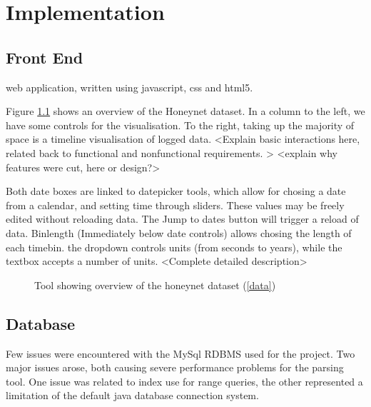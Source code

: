 \chapter{Implementation}\label{C:impl}

\section{Front End}  %

web application, written using javascript, css and html5.

Figure \ref{overview} shows an overview of the Honeynet dataset. In a column to the left, we have some controls for the visualisation. To the right, taking up the majority of space is a timeline visualisation of logged data.  
<Explain basic interactions here, related back to functional and nonfunctional requirements. >
<explain why features were cut, here or design?>

Both date boxes are linked to datepicker tools, which allow for chosing a date from a calendar, and setting time through sliders. These values may be freely edited without reloading data. The Jump to dates button will trigger a reload of data. 
Binlength (Immediately below date controls) allows chosing the length of each timebin. the dropdown controls units (from seconds to years), while the textbox accepts a number of units.
<Complete detailed description>
\begin{figure}[h!]
\caption{\protect\label{overview}Tool showing overview of the honeynet dataset (\ref{data})}
\end{figure}


\section{Database}\label{imp_db}
Few issues were encountered with the MySql RDBMS used for the project. Two major issues arose, both causing severe performance problems for the parsing tool. One issue was related to index use for range queries, the other represented a limitation of the default java database connection system. 

